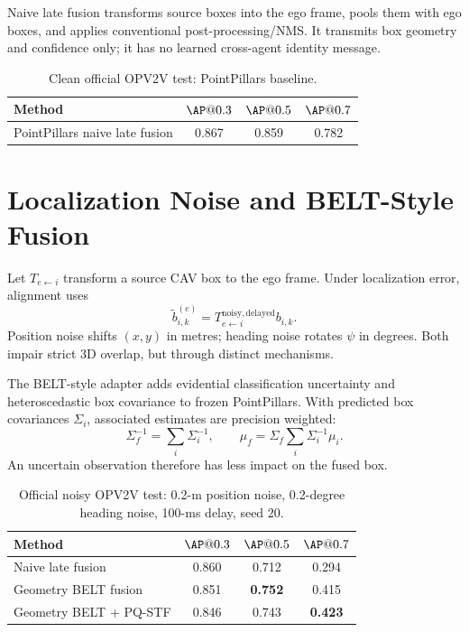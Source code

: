 \documentclass[11pt]{article}
\newcommand{\PQSTF}{\textsc{PQ-STF}}
\begin{document}
Naive late fusion transforms source boxes into the ego frame, pools them with
ego boxes, and applies conventional post-processing/NMS. It transmits box
geometry and confidence only; it has no learned cross-agent identity message.

\begin{table}[h]
\centering
\caption{Clean official OPV2V test: PointPillars baseline.}
\label{tab:pointpillars}
\begin{tabular}{lccc}
\toprule
Method & $\AP@0.3$ & $\AP@0.5$ & $\AP@0.7$\\
\midrule
PointPillars naive late fusion & 0.867 & 0.859 & 0.782\\
\bottomrule
\end{tabular}
\end{table}

\section{Localization Noise and BELT-Style Fusion}

Let $T_{e\leftarrow i}$ transform a source CAV box to the ego frame. Under
localization error, alignment uses
\begin{equation}
 \tilde b_{i,k}^{(e)}=T_{e\leftarrow i}^{\mathrm{noisy,delayed}}b_{i,k}.
\end{equation}
Position noise shifts $(x,y)$ in metres; heading noise rotates $\psi$ in
degrees. Both impair strict 3D overlap, but through distinct mechanisms.

The BELT-style adapter adds evidential classification uncertainty and
heteroscedastic box covariance to frozen PointPillars. With predicted box
covariances $\Sigma_i$, associated estimates are precision weighted:
\begin{equation}
 \Sigma_f^{-1}=\sum_i\Sigma_i^{-1},\qquad
 \mu_f=\Sigma_f\sum_i\Sigma_i^{-1}\mu_i.
\end{equation}
An uncertain observation therefore has less impact on the fused box.

\begin{table}[h]
\centering
\caption{Official noisy OPV2V test: 0.2-m position noise, 0.2-degree heading
noise, 100-ms delay, seed 20.}
\label{tab:noisy-belt}
\begin{tabular}{lccc}
\toprule
Method & $\AP@0.3$ & $\AP@0.5$ & $\AP@0.7$\\
\midrule
Naive late fusion & 0.860 & 0.712 & 0.294\\
Geometry BELT fusion & 0.851 & \textbf{0.752} & 0.415\\
Geometry BELT + \PQSTF & 0.846 & 0.743 & \textbf{0.423}\\
\bottomrule
\end{tabular}
\end{table}
\end{document}
